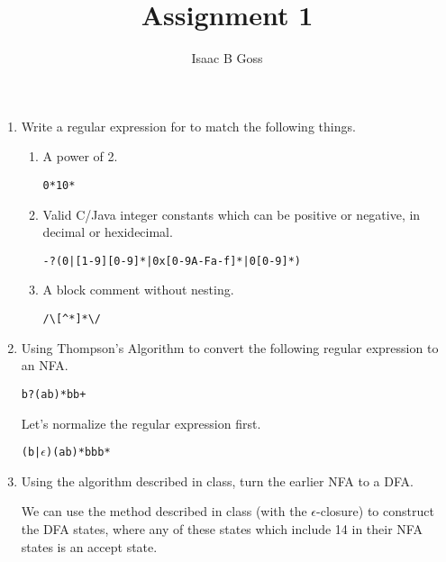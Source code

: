 \documentclass{article}
\author{Isaac B Goss}
\title{Assignment 1}
\date{}
\providecommand{\image}[1]{
    \begin{center}
        \includegraphics[width=0.95\textwidth]
            {#1}
    \end{center}
}
\begin{document}
\maketitle

\begin{enumerate}
    \item Write a regular expression for to match the following things.
    \begin{enumerate}
        \item A power of 2.
        \begin{verbatim}0*10*\end{verbatim}
        \item Valid C/Java integer constants which can be positive or negative, in decimal or hexidecimal.
        \begin{verbatim}-?(0|[1-9][0-9]*|0x[0-9A-Fa-f]*|0[0-9]*)\end{verbatim}
        \item A block comment without nesting.

        \texttt{/\textbackslash*[\^{}*]*\textbackslash*/}
    \end{enumerate}

    \item Using Thompson's Algorithm to convert the following regular expression to an NFA.
    
    \texttt{b?(ab)*bb+}

    Let's normalize the regular expression first.
    
    \texttt{(b|$\epsilon$)(ab)*bbb*}
    
    \vspace{4cm}
    \item Using the algorithm described in class, turn the earlier NFA to a DFA.

    We can use the method described in class (with the $\epsilon$-closure) to construct the DFA states,
    where any of these states which include 14 in their NFA states is an accept state.


\end{enumerate}
\end{document}
